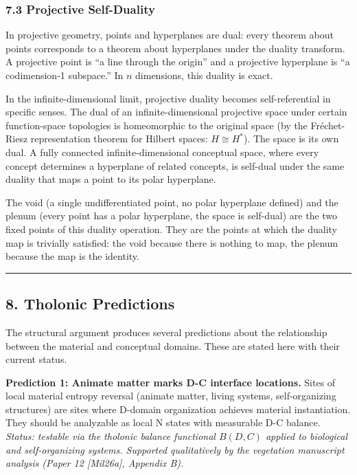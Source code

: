 \documentclass[
  11pt,
  letterpaper,
]{article}
\begin{document}
\subsubsection{7.3 Projective
Self-Duality}\label{projective-self-duality}

In projective geometry, points and hyperplanes are dual: every theorem
about points corresponds to a theorem about hyperplanes under the
duality transform. A projective point is ``a line through the origin''
and a projective hyperplane is ``a codimension-1 subspace.'' In \(n\)
dimensions, this duality is exact.

In the infinite-dimensional limit, projective duality becomes
self-referential in specific senses. The dual of an infinite-dimensional
projective space under certain function-space topologies is homeomorphic
to the original space (by the Fréchet-Riesz representation theorem for
Hilbert spaces: \(H \cong H^*\)). The space is its own dual. A fully
connected infinite-dimensional conceptual space, where every concept
determines a hyperplane of related concepts, is self-dual under the same
duality that maps a point to its polar hyperplane.

The void (a single undifferentiated point, no polar hyperplane defined)
and the plenum (every point has a polar hyperplane, the space is
self-dual) are the two fixed points of this duality operation. They are
the points at which the duality map is trivially satisfied: the void
because there is nothing to map, the plenum because the map is the
identity.

\begin{center}\rule{0.5\linewidth}{0.5pt}\end{center}

\subsection{8. Tholonic Predictions}\label{tholonic-predictions}

The structural argument produces several predictions about the
relationship between the material and conceptual domains. These are
stated here with their current status.

\textbf{Prediction 1: Animate matter marks D-C interface locations.}
Sites of local material entropy reversal (animate matter, living
systems, self-organizing structures) are sites where D-domain
organization achieves material instantiation. They should be analyzable
as local N states with measurable D-C balance. \emph{Status: testable
via the tholonic balance functional \(B(D,C)\) applied to biological and
self-organizing systems. Supported qualitatively by the vegetation
manuscript analysis (Paper 12 {[}Mil26a{]}, Appendix B).}
\end{document}
